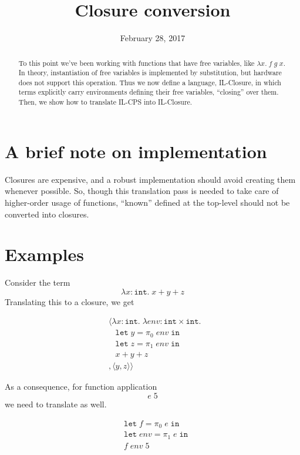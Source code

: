 \documentclass{article}
\title{Closure conversion}
\date{February 28, 2017}
\newcommand{\kwd}[1]{\ensuremath{\mathtt{#1}}}
\newcommand{\intt}{\ensuremath{\mathtt{int}}}
\newcommand{\vect}[1]{\langle #1 \rangle}
\begin{document}
\maketitle

\begin{abstract}
  To this point we've been working with functions that have free variables, like
  $\lambda x. \; f \; g \; x$. In theory, instantiation of free variables is
  implemented by substitution, but hardware does not support this operation.
  Thus we now define a language, IL-Closure, in which terms explicitly carry
  environments defining their free variables, ``closing'' over them. Then, we
  show how to translate IL-CPS into IL-Closure.
\end{abstract}

\section{A brief note on implementation}

Closures are expensive, and a robust implementation should avoid creating them
whenever possible. So, though this translation pass is needed to take care of
higher-order usage of functions, ``known'' defined at the top-level should not
be converted into closures.

\section{Examples}

Consider the term
\[
  \lambda x : \intt. \; x + y + z
\]
Translating this to a closure, we get

\begin{align*}
  &\vect{\lambda x : \intt. \; \lambda env : \intt \times \intt. \; \\
  & \; \; \; \kwd{let} \; y = \pi_0 \; env \; \kwd{in} \\
  & \; \; \; \kwd{let} \; z = \pi_1 \; env \; \kwd{in} \\
  & \; \; \; x + y + z \\
  &, \vect{y, z}}
\end{align*}

As a consequence, for function application
\[
  e \; 5
\]
we need to translate as well.

\begin{align*}
  &\kwd{let} \; f = \pi_0 \; e \; \kwd{in} \\
  &\kwd{let} \; env = \pi_1 \; e \; \kwd{in} \\
  &f \; env \; 5
\end{align*}
\end{document}
